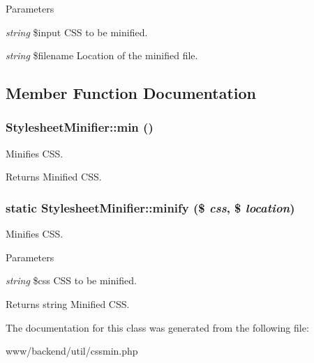 \begin{DoxyParams}{Parameters}
\item[{\em string}]\$input CSS to be minified. \item[{\em string}]\$filename Location of the minified file. \end{DoxyParams}


\subsection{Member Function Documentation}
\hypertarget{classStylesheetMinifier_aa185a19e69c11f247a058e2c43dc73e8}{
\subsubsection[{min}]{\setlength{\rightskip}{0pt plus 5cm}StylesheetMinifier::min ()}}
\label{classStylesheetMinifier_aa185a19e69c11f247a058e2c43dc73e8}
Minifies CSS.

\begin{DoxyReturn}{Returns}
Minified CSS. 
\end{DoxyReturn}
\hypertarget{classStylesheetMinifier_a2da30cbda1ae51979913dce518f7e2cb}{
\subsubsection[{minify}]{\setlength{\rightskip}{0pt plus 5cm}static StylesheetMinifier::minify (\$ {\em css}, \/  \$ {\em location})}}
\label{classStylesheetMinifier_a2da30cbda1ae51979913dce518f7e2cb}
Minifies CSS.


\begin{DoxyParams}{Parameters}
\item[{\em string}]\$css CSS to be minified.\end{DoxyParams}
\begin{DoxyReturn}{Returns}
string Minified CSS. 
\end{DoxyReturn}


The documentation for this class was generated from the following file:\begin{DoxyCompactItemize}
\item 
www/backend/util/cssmin.php\end{DoxyCompactItemize}
